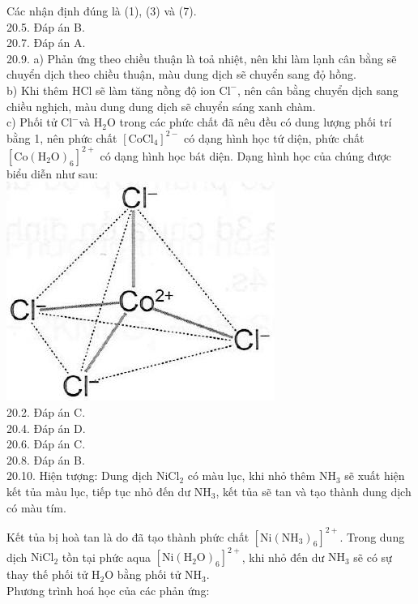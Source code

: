 \documentclass[10pt]{article}
\begin{document}
Các nhận định đúng là (1), (3) và (7).\\
20.5. Đáp án B.\\
20.7. Đáp án A.\\
20.9. a) Phản ứng theo chiều thuận là toả nhiệt, nên khi làm lạnh cân bằng sẽ chuyển dịch theo chiều thuận, màu dung dịch sẽ chuyển sang đọ̉ hồng.\\
b) Khi thêm HCl sẽ làm tăng nồng độ ion $\mathrm{Cl}^{-}$, nên cân bằng chuyển dịch sang chiều nghịch, màu dung dung dịch sẽ chuyển sáng xanh chàm.\\
c) Phối tử $\mathrm{Cl}^{-}$và $\mathrm{H}_{2} \mathrm{O}$ trong các phức chất đã nêu đều có dung lượng phối trí bằng 1, nên phức chất $\left[\mathrm{CoCl}_{4}\right]^{2-}$ có dạng hình học tứ diện, phức chất $\left[\mathrm{Co}\left(\mathrm{H}_{2} \mathrm{O}\right)_{6}\right]^{2+}$ có dạng hình học bát diện. Dạng hình học của chúng được biểu diễn như sau:\\
\includegraphics[max width=\textwidth, center]{2025_10_23_b4e16b74380d0f7e7700g-117(1)}\\
20.2. Đáp án C.\\
20.4. Đáp án D.\\
20.6. Đáp án C.\\
20.8. Đáp án B.\\
20.10. Hiện tượng: Dung dịch $\mathrm{NiCl}_{2}$ có màu lục, khi nhỏ thêm $\mathrm{NH}_{3}$ sẽ xuất hiện kết tủa màu lục, tiếp tục nhỏ đến dư $\mathrm{NH}_{3}$, kết tủa sẽ tan và tạo thành dung dịch có màu tím.

Kết tủa bị hoà tan là do đã tạo thành phức chất $\left[\mathrm{Ni}\left(\mathrm{NH}_{3}\right)_{6}\right]^{2+}$. Trong dung dịch $\mathrm{NiCl}_{2}$ tồn tại phức aqua $\left[\mathrm{Ni}\left(\mathrm{H}_{2} \mathrm{O}\right)_{6}\right]^{2+}$, khi nhỏ đến dư $\mathrm{NH}_{3}$ sẽ có sự thay thế phối tử $\mathrm{H}_{2} \mathrm{O}$ bằng phối tử $\mathrm{NH}_{3}$.\\
Phương trình hoá học của các phản ứng:
\end{document}
